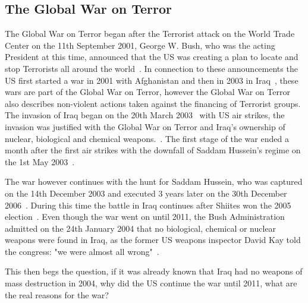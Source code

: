 \subsection{The Global War on Terror}
The Global War on Terror began after the Terrorist attack on the World Trade Center on the 11th September 2001, George W. Bush, who was the acting President at this time, announced that the US was creating a plan to locate and stop Terrorists all around the world~\autocite{gowt-bushlibrary}. In connection to these announcements the US first started a war in 2001 with Afghanistan and then in 2003 in Iraq~\autocite{gowt-bushlibrary}, these wars are part of the Global War on Terror, however the Global War on Terror also describes non-violent actions taken against the financing of Terrorist groups.
The invasion of Iraq began on the 20th March 2003~\autocite{cfr-iraq-war} with US air strikes, the invasion was justified with the Global War on Terror and Iraq's ownership of nuclear, biological and chemical weapons.~\autocite{britannica-iraq-war}. The first stage of the war ended a month after the first air strikes with the downfall of Saddam Hussein's regime on the 1st May 2003~\autocite{cfr-iraq-war}. 

The war however continues with the hunt for Saddam Hussein, who was captured on the 14th December 2003 and executed 3 years later on the 30th December 2006~\autocite{cfr-iraq-war}. During this time the battle in Iraq continues after Shiites won the 2005 election~\autocite{cfr-iraq-war}.
Even though the war went on until 2011, the Bush Administration admitted on the 24th January 2004 that no biological, chemical or nuclear weapons were found in Iraq, as the former US weapons inspector David Kay told the congress: "we were almost all wrong"~\autocite{cnn-david-kay-senate-hearing}.

This then begs the question, if it was already known that Iraq had no weapons of mass destruction in 2004, why did the US continue the war until 2011, what are the real reasons for the war?